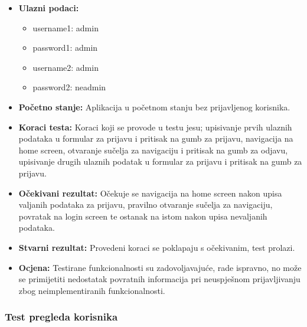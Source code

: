 			 \begin{itemize}
			 	
			 \item{\textbf{Ulazni podaci:}}
			 \begin{itemize}
			 	\item{username1: admin}
			 	\item{password1: admin}
			 	\item{username2: admin}
			 	\item{password2: neadmin}
			 \end{itemize}
			 
			 \item{\textbf{Početno stanje:} Aplikacija u početnom stanju bez prijavljenog korisnika.}
			 
			 \item{\textbf{Koraci testa:} Koraci koji se provode u testu jesu; upisivanje prvih ulaznih podataka u formular za prijavu i pritisak na gumb za prijavu, navigacija na home screen, otvaranje sučelja za navigaciju i pritisak na gumb za odjavu, upisivanje drugih ulaznih podatak u formular za prijavu i pritisak na gumb za prijavu.}
			 
			 \item{\textbf{Očekivani rezultat:} Očekuje se navigacija na home screen nakon upisa valjanih podataka za prijavu, pravilno otvaranje sučelja za navigaciju, povratak na login screen te ostanak na istom nakon upisa nevaljanih podataka.}
			 
			 \item{\textbf{Stvarni rezultat:} Provedeni koraci se poklapaju s očekivanim, test prolazi.}
			 
			 \item{\textbf{Ocjena:} Testirane funkcionalnosti su zadovoljavajuće, rade ispravno, no može se primijetiti nedostatak povratnih informacija pri neuspješnom prijavljivanju zbog neimplementiranih funkcionalnosti.}
			 
			\end{itemize}
			
			\subsubsection{Test pregleda korisnika}
			
